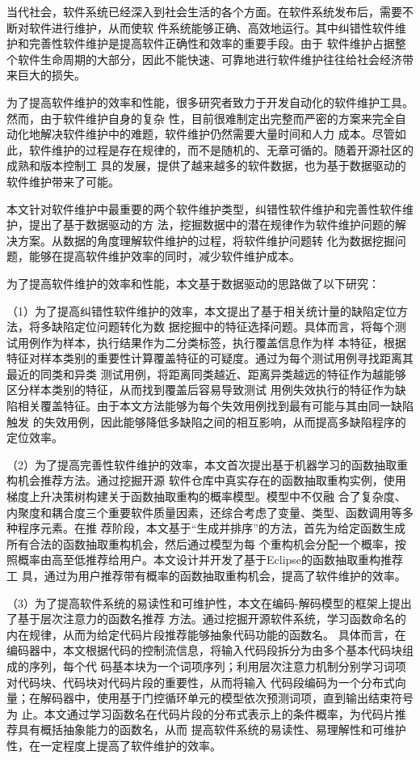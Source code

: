 

\begin{zhaiyao}

当代社会，软件系统已经深入到社会生活的各个方面。在软件系统发布后，需要不断对软件进行维护，从而使软
件系统能够正确、高效地运行。其中纠错性软件维护和完善性软件维护是提高软件正确性和效率的重要手段。由于
软件维护占据整个软件生命周期的大部分，因此不能快速、可靠地进行软件维护往往给社会经济带来巨大的损失。

为了提高软件维护的效率和性能，很多研究者致力于开发自动化的软件维护工具。然而，由于软件维护自身的复杂
性，目前很难制定出完整而严密的方案来完全自动化地解决软件维护中的难题，软件维护仍然需要大量时间和人力
成本。尽管如此，软件维护的过程是存在规律的，而不是随机的、无章可循的。随着开源社区的成熟和版本控制工
具的发展，提供了越来越多的软件数据，也为基于数据驱动的软件维护带来了可能。

本文针对软件维护中最重要的两个软件维护类型，纠错性软件维护和完善性软件维护，提出了基于数据驱动的方
法，挖掘数据中的潜在规律作为软件维护问题的解决方案。从数据的角度理解软件维护的过程，将软件维护问题转
化为数据挖掘问题，能够在提高软件维护效率的同时，减少软件维护成本。

为了提高软件维护的效率和性能，本文基于数据驱动的思路做了以下研究：

（1）为了提高纠错性软件维护的效率，本文提出了基于相关统计量的缺陷定位方法，将多缺陷定位问题转化为数
据挖掘中的特征选择问题。具体而言，将每个测试用例作为样本，执行结果作为二分类标签，执行覆盖信息作为样
本特征，根据特征对样本类别的重要性计算覆盖特征的可疑度。通过为每个测试用例寻找距离其最近的同类和异类
测试用例，将距离同类越近、距离异类越远的特征作为越能够区分样本类别的特征，从而找到覆盖后容易导致测试
用例失效执行的特征作为缺陷相关覆盖特征。由于本文方法能够为每个失效用例找到最有可能与其由同一缺陷触发
的失效用例，因此能够降低多缺陷之间的相互影响，从而提高多缺陷程序的定位效率。

（2）为了提高完善性软件维护的效率，本文首次提出基于机器学习的函数抽取重构机会推荐方法。通过挖掘开源
软件仓库中真实存在的函数抽取重构实例，使用梯度上升决策树构建关于函数抽取重构的概率模型。模型中不仅融
合了复杂度、内聚度和耦合度三个重要软件质量因素，还综合考虑了变量、类型、函数调用等多种程序元素。在推
荐阶段，本文基于``生成并排序''的方法，首先为给定函数生成所有合法的函数抽取重构机会，然后通过模型为每
个重构机会分配一个概率，按照概率由高至低推荐给用户。本文设计并开发了基于Eclipse的函数抽取重构推荐工
具，通过为用户推荐带有概率的函数抽取重构机会，提高了软件维护的效率。

（3）为了提高软件系统的易读性和可维护性，本文在编码-解码模型的框架上提出了基于层次注意力的函数名推荐
方法。通过挖掘开源软件系统，学习函数命名的内在规律，从而为给定代码片段推荐能够抽象代码功能的函数名。
具体而言，在编码器中，本文根据代码的控制流信息，将输入代码段拆分为由多个基本代码块组成的序列，每个代
码基本块为一个词项序列；利用层次注意力机制分别学习词项对代码块、代码块对代码片段的重要性，从而将输入
代码段编码为一个分布式向量；在解码器中，使用基于门控循环单元的模型依次预测词项，直到输出结束符号为
止。本文通过学习函数名在代码片段的分布式表示上的条件概率，为代码片推荐具有概括抽象能力的函数名，从而
提高软件系统的易读性、易理解性和可维护性，在一定程度上提高了软件维护的效率。
\end{zhaiyao}

